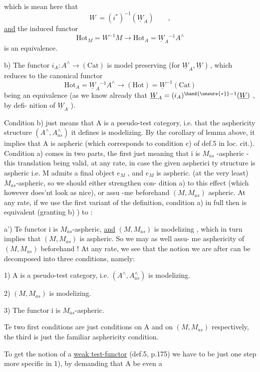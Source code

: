 
which is mean here that
\[ W \ =(i^{*})^{-1}(\underline{W}_A) \qquad , \]
\uline{and} the induced functor
\[ \mathrm{Hot}_M = W^{-1}M \to \mathrm{Hot}_A = \underline{W}_A{}^{-1}A^{\wedge} \]
is an equivalence.

b) The functor $i_A : A^{\wedge} \to (\mathrm{Cat})$ is model preserving (for $\underline{W}_A,\underline{W}$ ) ,
which reduces to the canonical functor
\[ \mathrm{Hot}_A = \underline{W}_A{}^{-1}A^{\wedge} \longrightarrow (\mathrm{Hot}) = \underline{W}^{-1}(\mathrm{Cat}) \]
being an equivalence (as we know already that $\underline{W}_A =(i_A)^{\hand{\unsure{*}}-1}(\underline{W})$ , by defi-%
nition of $\underline{W}_A$ ).

Condition b) just means that A is a pseudo-test category, i.e.
that  the asphericity structure $(A^{\wedge},A^{\wedge}_{as})$ it defines is modelizing.
By the corollary of lemma above, it implies that A is aspheric (which
corresponds to condition c) of def.5 in loc. cit.). Condition a)
comes in two parts, the first just meaning that i is $M_{as}$ -aspheric -
this translation being valid, at any rate, in case  the given aspherici
ty structure is aspheric i.e. M admits a final object $e_M$ , and $e_M$ is
aspheric.  
(at the very least) $M_{as}$-aspheric, so we should either strengthen con-%
dition a) to this effect (which however does'nt look as nice), or assu%
-me beforehand  $(M,M_{as})$ aspheric. At any rate, if we use
the first variant of the definition, condition a) in full then 
is equivalent (granting b) ) to :

a') Te functor i is $M_{as}$-aspheric, \uline{and} $(M,M_{as})$ is modelizing ,
which in turn implies that $(M,M_{as})$ is aspheric. So we may as well assu-%
me asphericity of $(M,M_{as})$ beforehand ! At any rate, we see that the
notion we are after can be decomposed into three conditions, namely:

1) A is a pseudo-test category, i.e. $(A^{\wedge},A^{\wedge}_{as})$ is modelizing.

2) $(M,M_{as})$ is modelizing.

3) The functor i is $M_{as}$-aspheric.

Te two first conditions are just conditions on A and on $(M,M_{as})$
respectively, the third is just the familiar asphericity condition.

To get the notion of a \uline{weak test-functor} (def.5, p.175) we have to
be just one step more specific in 1), by demanding that A be even a


